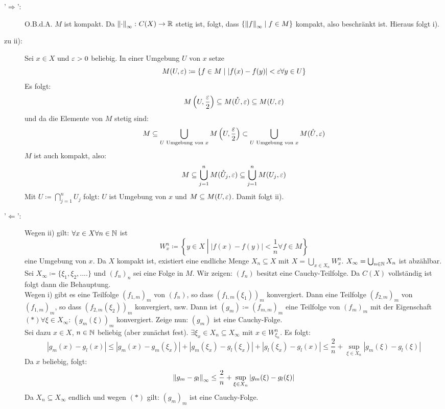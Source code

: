 \begin{beweis}
	\begin{description}
		\item['$ \Rightarrow $':] O.B.d.A. $ M $ ist kompakt. Da $ \left\|\cdot\right\|_\infty\colon C(X)\rightarrow\mathbb{R} $ stetig ist, folgt, dass $ \lbrace \left\|f\right\|_\infty\mid f\in M\rbrace $ kompakt, also beschr\"ankt ist. Hieraus folgt i).
		\item[zu ii):] Sei $ x\in X $ und $ \varepsilon>0 $ beliebig. In einer Umgebung $ U $ von $ x $ setze \[ M(U,\varepsilon)\coloneqq\lbrace f\in M\mid |f(x)-f(y)|<\varepsilon\forall y\in U\rbrace \]
		Es folgt:
		\[ M\left(U,\frac{\varepsilon}{2}\right)\subseteq M(\mathring U,\varepsilon)\subseteq M(U,\varepsilon) \]
		und da die Elemente von $ M $ stetig sind:
		\[ M\subseteq\bigcup_{U\text{ Umgebung von }x} M\left(U,\frac{\varepsilon}{2}\right)\subset\bigcup_{U\text{ Umgebung von }x}M(\mathring U,\varepsilon) \]
		$ M $ ist auch kompakt, also:
		\[ M\subseteq\bigcup_{j=1}^n M(\mathring U_j,\varepsilon)\subseteq\bigcup_{j=1}^n M(U_j,\varepsilon) \]
		Mit $ U\coloneqq\bigcap_{j=1}^n U_j $ folgt: $ U $ ist Umgebung von $ x $ und $ M\subseteq M(U,\varepsilon) $. Damit folgt ii).
		\item['$ \Leftarrow $':] Wegen ii) gilt: $ \forall x\in X\forall n\in\mathbb{N} $ ist
		\[ W_x^n\coloneqq\left\lbrace y\in X\middle| |f(x)-f(y)|<\frac{1}{n}\forall f\in M\right\rbrace \]
		eine Umgebung von $ x $. Da $ X $ kompakt ist, existiert eine endliche Menge $ X_n\subseteq X $ mit $ X=\bigcup_{x\in X_n}W_x^n $. $ X_\infty=\bigcup_{n\in\mathbb{N}} X_n $ ist abz\"ahlbar.\\
		Sei $ X_\infty\coloneqq\lbrace\xi_1,\xi_2,....\rbrace $ und $ (f_n)_n $ sei eine Folge in $ M $. Wir zeigen: $ (f_n) $ besitzt eine Cauchy-Teilfolge. Da $ C(X) $ vollst\"andig ist folgt dann die Behauptung.\\
		Wegen i) gibt es eine Teilfolge $ (f_{1,m})_m $ von $ (f_n) $, so dass $ (f_{1,m}(\xi_1))_m $ konvergiert. Dann eine Teilfolge $ (f_{2,m})_m $ von $ (f_{1,m})_m $, so dass $ (f_{2,m}(\xi_2))_m $ konvergiert, usw. Dann ist $ (g_m)\coloneqq(f_{m,m})_m $ eine Teilfolge von $ (f_m)_m $ mit der Eigenschaft $ (\ast)\forall\xi\in X_\infty $: $ (g_m(\xi))_m $ konvergiert. Zeige nun: $ (g_m) $ ist eine Cauchy-Folge.\\
		Sei dazu $ x\in X $, $ n\in\mathbb{N} $ beliebig (aber zun\"achst fest). $ \exists \xi_x\in X_n\subseteq X_\infty $ mit $ x\in W^n_{\xi_n} $. Es folgt:
		\[ |g_m(x)-g_l(x)|\leq|g_m(x)-g_m(\xi_x)|+|g_m(\xi_x)-g_l(\xi_x)|+|g_l(\xi_x)-g_l(x)|\leq\frac{2}{n}+\sup_{\xi\in X_n}|g_m(\xi)-g_l(\xi)| \]
		Da $ x $ beliebig, folgt:
		\[ \left\|g_m-g_l\right\|_\infty\leq\frac{2}{n}+\sup_{\xi\in X_n}|g_m(\xi)-g_l(\xi)| \]
		Da $ X_n\subseteq X_\infty $ endlich und wegen $ (\ast) $ gilt: $ (g_m)_m $ ist eine Cauchy-Folge.
	\end{description}
\end{beweis}
